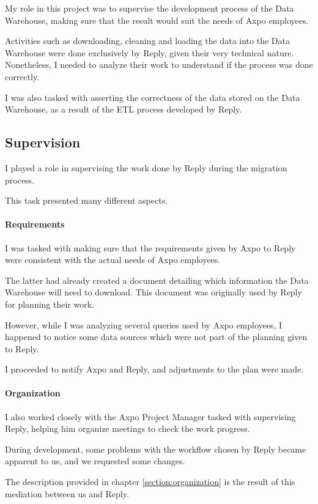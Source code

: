 My role in this project was to supervise the development process of the Data Warehouse, making sure that the result would suit the needs of Axpo employees.

Activities such as downloading, cleaning and loading the data into the Data Warehouse were done exclusively by Reply, given their very technical nature.
Nonetheless, I needed to analyze their work to understand if the process was done correctly.

I was also tasked with asserting the correctness of the data stored on the Data Warehouse, as a result of the ETL process developed by Reply.

\subsection{Supervision}
    I played a role in supervising the work done by Reply during the migration process.
    
    This task presented many different aspects.
    \paragraph{Requirements}
        I was tasked with making sure that the requirements given by Axpo to Reply were consistent with the actual needs of Axpo employees.
        
        The latter had already created a document detailing which information the Data Warehouse will need to download.
        This document was originally used by Reply for planning their work.
        
        However, while I was analyzing several queries used by Axpo employees, I happened to notice some data sources which were not part of the planning given to Reply.
        
        I proceeded to notify Axpo and Reply, and adjustments to the plan were made.
        
    \paragraph{Organization}
        I also worked closely with the Axpo Project Manager tasked with supervising Reply, helping him organize meetings to check the work progress.
        
        During development, some problems with the workflow chosen by Reply became apparent to us, and we requested some changes.
        
        The description provided in chapter \ref{section:organization} is the result of this mediation between us and Reply.
    
